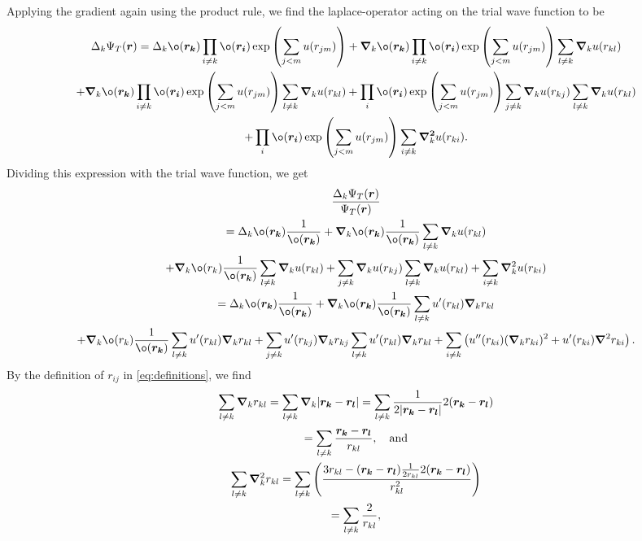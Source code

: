 Applying the gradient again using the product rule, we find the laplace-operator acting on the trial wave function to be
\begin{gather*}
	\Delta _{k} \Psi _{T}(\boldsymbol{r}) = \Delta _{k}ø(\boldsymbol{r_k})\prod_{i\neq k}^{}ø(\boldsymbol{r_i})
	\exp\left(\sum_{j<m}^{} u(r _{jm})\right) + \grad _{k}ø(\boldsymbol{r_k})\prod_{i\neq k}^{}ø(\boldsymbol{r_i})\exp\left(\sum_{j<m}^{} u(r _{jm})\right) \sum_{l \neq  k} \boldsymbol{\nabla} _ku(r _{kl})\\
	+\boldsymbol{ \nabla }_kø(\boldsymbol{r_k}) \prod_{i \neq k}^{} ø(\boldsymbol{r_i})
	\exp\left(\sum_{j<m}^{} u(r _{jm})\right) \sum_{l \neq  k} \boldsymbol{\nabla} _ku(r _{kl}) + \prod_{i}^{}
	ø(\boldsymbol{r_i}) \exp\left(\sum_{j<m}^{} u(r _{jm})\right) \sum_{j \neq k}^{} \boldsymbol{\nabla }_ku(r _{kj})\sum_{l \neq k}^{} \boldsymbol{\nabla }_ku(r _{kl}) \\
	+\prod_{i}^{} ø(\boldsymbol{r_i})\exp\left(\sum_{j<m}^{} u(r _{jm}	)\right)
	\sum_{i \neq k} \boldsymbol{\nabla ^2} _ku(r _{ki}).
\end{gather*}
Dividing this expression with the trial wave function, we get
\begin{gather*}
	\frac{\Delta _{k} \Psi _{T}(\boldsymbol{r})}{\Psi _{T}(\boldsymbol{r})}\\
	=\Delta _{k}ø(\boldsymbol{r_k})\frac{1}{ø(\boldsymbol{r_k})} + \grad _{k}ø(\boldsymbol{r_k}) \frac{1}{ø(\boldsymbol{r_k})} \sum_{l \neq  k} \boldsymbol{\nabla} _ku(r _{kl})\\
	+\boldsymbol{ \nabla }_kø(r_k)  \frac{1}{ø(\boldsymbol{r_k})} \sum_{l
		\neq  k} \boldsymbol{\nabla} _ku(r _{kl}) + \sum_{j \neq k}^{}
	\grad_ku(r _{kj})\sum_{l \neq k}^{} \grad_ku(r _{kl})
	+\sum_{i \neq k} \grad^2 _ku(r _{ki})\\
	=\Delta _{k}ø(\boldsymbol{r_k})\frac{1}{ø(\boldsymbol{r_k})} + \grad
	_{k}ø(\boldsymbol{r_k}) \frac{1}{ø(\boldsymbol{r_k})} \sum_{l \neq  k}
	u'(r _{kl})\boldsymbol{\nabla} _kr _{kl} \\
	+\boldsymbol{ \nabla }_kø(r_k)  \frac{1}{ø(\boldsymbol{r_k})} \sum_{l
		\neq  k} u'(r _{kl})\boldsymbol{\nabla} _k r _{kl}+ \sum_{j \neq k}^{}
	u'(r _{kj})\grad_k r _{kj}\sum_{l \neq k}^{} u'(r _{kl})\grad_k r _{kl}
	+\sum_{i \neq k} \left(u''(r _{ki})(\grad _k r _{ki})^2+u'(r _{ki})\grad ^2
	r _{ki}\right).
\end{gather*}
By the definition of $r _{ij}$ in \autoref{eq:definitions}, we find
\begin{gather*}
	\sum_{l \neq k }^{} \grad _k r _{kl} = \sum_{l \neq k }^{} \grad _k |\boldsymbol{r_k}-\boldsymbol{r_l}| = \sum_{l \neq k }^{} \frac{1}{2|\boldsymbol{r_k}-\boldsymbol{r_l}|}2(\boldsymbol{r_k}-\boldsymbol{r_l})\\
	= \sum_{l \neq k }^{} \frac{\boldsymbol{r_k}-\boldsymbol{r_l}}{r _{kl}}, \quad \text{and}\\
	\sum_{l \neq k}^{} \grad^2 _k r _{kl} = \sum_{l \neq k}^{} \left( \frac{3r _{kl}-(\boldsymbol{r_k}-\boldsymbol{r_l})\frac{1}{2r _{kl}}2(\boldsymbol{r_k}-\boldsymbol{r_l})}{r _{kl}^2}\right)\\
	= \sum_{l \neq k}^{} \frac{2}{r _{kl}} ,
\end{gather*}
